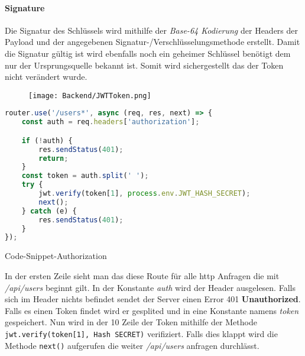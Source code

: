 \paragraph{Signature}
Die Signatur des Schlüssels wird mithilfe der \textit{Base-64 Kodierung} der Headers
der Payload und der angegebenen Signatur-/Verschlüsselungsmethode erstellt. Damit die Signatur
gültig ist wird ebenfalls noch ein geheimer Schlüssel benötigt dem nur der Ursprungsquelle bekannt
ist. Somit wird sichergestellt das der Token nicht verändert wurde.

\begin{figure}[H]
    \begin{center}
        \texttt{[image: Backend/JWTToken.png]}
    \end{center}
    \cite{PictureJWT}
\end{figure}

\pagebreak


\begin{code}[htp]
    \begin{lstlisting}[firstnumber=1,language=JavaScript, style=CMD]
    router.use('/users*', async (req, res, next) => {
    const auth = req.headers['authorization'];

    if (!auth) {
        res.sendStatus(401);
        return;
    }
    const token = auth.split(' ');
    try {
        jwt.verify(token[1], process.env.JWT_HASH_SECRET);
        next();
    } catch (e) {
        res.sendStatus(401);
    }
});
    \end{lstlisting}
    \caption{Code-Snippet-Authorization}
\end{code}

In der ersten Zeile sieht man das diese Route für alle http Anfragen
die mit \textit{/api/users} beginnt gilt. In der Konstante \textit{auth}
wird der Header ausgelesen. Falls sich im Header nichts befindet sendet der
Server einen Error 401 \textbf{Unauthorized}. Falls es einen Token findet
wird er gesplited und in eine Konstante namens \textit{token} gespeichert.
Nun wird in der 10 Zeile der Token mithilfe der Methode \texttt{jwt.verify(token[1], Hash SECRET)}
verifiziert. Falls dies klappt wird die Methode \texttt{next()} aufgerufen die
weiter \textit{/api/users} anfragen durchlässt.


\cite{JWT}


